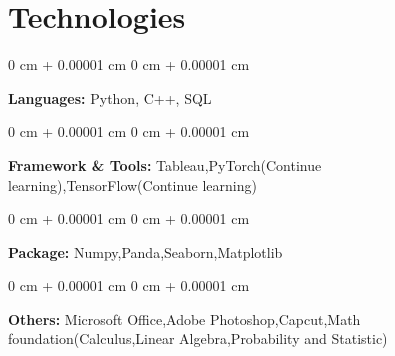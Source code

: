 \documentclass[10pt, letterpaper]{article}
\newenvironment{onecolentry}{
    \begin{adjustwidth}{
        0 cm + 0.00001 cm
    }{
        0 cm + 0.00001 cm
    }
}{
    \end{adjustwidth}
} %
\begin{document}
    
    \section{Technologies}



        
        \begin{onecolentry}
            \textbf{Languages:} Python, C++,  SQL
        \end{onecolentry}

        \vspace{0.2 cm}

        \begin{onecolentry}
            \textbf{Framework \& Tools:} Tableau,PyTorch(Continue learning),TensorFlow(Continue learning)
        \end{onecolentry}
        \vspace{0.2 cm}

        \begin{onecolentry}
            \textbf{Package:} Numpy,Panda,Seaborn,Matplotlib
        \end{onecolentry}
        \vspace{0.2 cm}

        \begin{onecolentry}
            \textbf{Others:} Microsoft Office,Adobe Photoshop,Capcut,Math foundation(Calculus,Linear Algebra,Probability and Statistic)
        \end{onecolentry}
        \vspace{0.2 cm}
    
\end{document}
